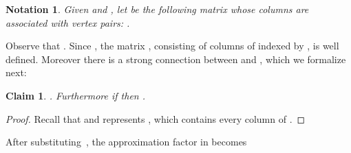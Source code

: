 \documentclass{article}
\newtheorem{claim}{Claim}[section]
\newtheorem{notation}{Notation}[section]
\begin{document}
\begin{notation} Given  and
  , let  be the following
  matrix whose columns are associated with vertex pairs:
  .
  \label{not:xmat}
\end{notation}
Observe that .
Since , the matrix
, consisting of columns of  indexed by
, is well defined.  Moreover there is a strong connection
between  and , which we
formalize next:
\begin{claim}
  . Furthermore if
   then .
\end{claim}
\begin{proof}
  Recall that  and  represents
  , which contains every
  column of .
\end{proof} 

After substituting~, the approximation factor in
 becomes
\end{document}
